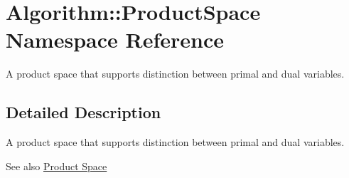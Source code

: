 \hypertarget{namespaceAlgorithm_1_1ProductSpace}{}\section{Algorithm\+:\+:Product\+Space Namespace Reference}
\label{namespaceAlgorithm_1_1ProductSpace}


A product space that supports distinction between primal and dual variables.  




\subsection{Detailed Description}
A product space that supports distinction between primal and dual variables. 

\begin{DoxySeeAlso}{See also}
\hyperlink{group__ProductSpaceGroup}{Product Space} 
\end{DoxySeeAlso}
